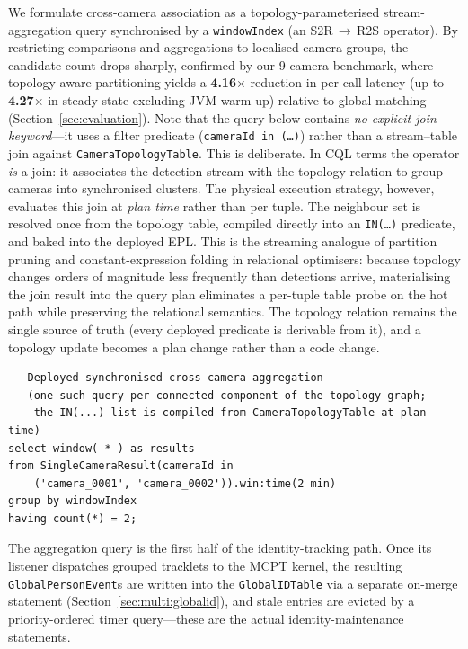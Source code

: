 \documentclass[review]{elsarticle}
\begin{document}
We formulate cross-camera association as a topology-parameterised stream-aggregation query synchronised by a \texttt{windowIndex} (an S2R\,$\to$\,R2S operator). By restricting comparisons and aggregations to localised camera groups, the candidate count drops sharply, confirmed by our 9-camera benchmark, where topology-aware partitioning yields a \textbf{4.16$\times$} reduction in per-call latency (up to \textbf{4.27$\times$} in steady state excluding JVM warm-up) relative to global matching (Section~\ref{sec:evaluation}).
Note that the query below contains \emph{no explicit join keyword}---it uses a filter predicate (\texttt{cameraId in (\dots)}) rather than a stream--table join against \texttt{CameraTopologyTable}. This is deliberate. In CQL terms the operator \emph{is} a join: it associates the detection stream with the topology relation to group cameras into synchronised clusters. The physical execution strategy, however, evaluates this join at \emph{plan time} rather than per tuple. The neighbour set is resolved once from the topology table, compiled directly into an \texttt{IN(\dots)} predicate, and baked into the deployed EPL. This is the streaming analogue of partition pruning and constant-expression folding in relational optimisers: because topology changes orders of magnitude less frequently than detections arrive, materialising the join result into the query plan eliminates a per-tuple table probe on the hot path while preserving the relational semantics. The topology relation remains the single source of truth (every deployed predicate is derivable from it), and a topology update becomes a plan change rather than a code change.
\begin{verbatim}
-- Deployed synchronised cross-camera aggregation
-- (one such query per connected component of the topology graph;
--  the IN(...) list is compiled from CameraTopologyTable at plan time)
select window( * ) as results
from SingleCameraResult(cameraId in
    ('camera_0001', 'camera_0002')).win:time(2 min)
group by windowIndex
having count(*) = 2;
\end{verbatim}
The aggregation query is the first half of the identity-tracking path. Once its listener dispatches grouped tracklets to the MCPT kernel, the resulting \texttt{GlobalPersonEvent}s are written into the \texttt{GlobalIDTable} via a separate on-merge statement (Section~\ref{sec:multi:globalid}), and stale entries are evicted by a priority-ordered timer query---these are the actual identity-maintenance statements.
\end{document}
